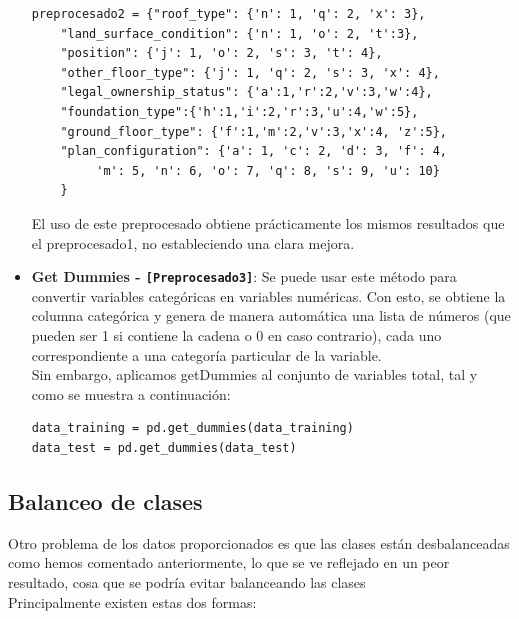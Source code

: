 \begin{itemize}
\begin{lstlisting}[frame=single]
preprocesado2 = {"roof_type": {'n': 1, 'q': 2, 'x': 3},
	"land_surface_condition": {'n': 1, 'o': 2, 't':3},
	"position": {'j': 1, 'o': 2, 's': 3, 't': 4},
	"other_floor_type": {'j': 1, 'q': 2, 's': 3, 'x': 4},
	"legal_ownership_status": {'a':1,'r':2,'v':3,'w':4},         
	"foundation_type":{'h':1,'i':2,'r':3,'u':4,'w':5},               
	"ground_floor_type": {'f':1,'m':2,'v':3,'x':4, 'z':5},
	"plan_configuration": {'a': 1, 'c': 2, 'd': 3, 'f': 4, 
	     'm': 5, 'n': 6, 'o': 7, 'q': 8, 's': 9, 'u': 10}
	}
	\end{lstlisting}
	
	El uso de este preprocesado obtiene prácticamente los mismos resultados que el preprocesado1, no estableciendo una clara mejora.
	
	\item \textbf{Get Dummies - \texttt{[Preprocesado3]}}: Se puede usar este método para convertir variables categóricas en variables numéricas. Con esto, se obtiene la columna categórica y genera de manera automática una lista de números (que pueden ser 1 si contiene la cadena o 0 en caso contrario), cada uno correspondiente a una categoría particular de la variable. \\ Sin embargo, aplicamos getDummies al conjunto de variables total, tal y como se muestra a continuación:
	
	\begin{lstlisting}[frame=single]
data_training = pd.get_dummies(data_training)
data_test = pd.get_dummies(data_test)
	\end{lstlisting}

\end{itemize}


\subsection{Balanceo de clases}
Otro problema de los datos proporcionados es que las clases están desbalanceadas como hemos comentado anteriormente, lo que se ve reflejado en un peor resultado, cosa que se podría evitar balanceando las clases \\ 
Principalmente existen estas dos formas:


